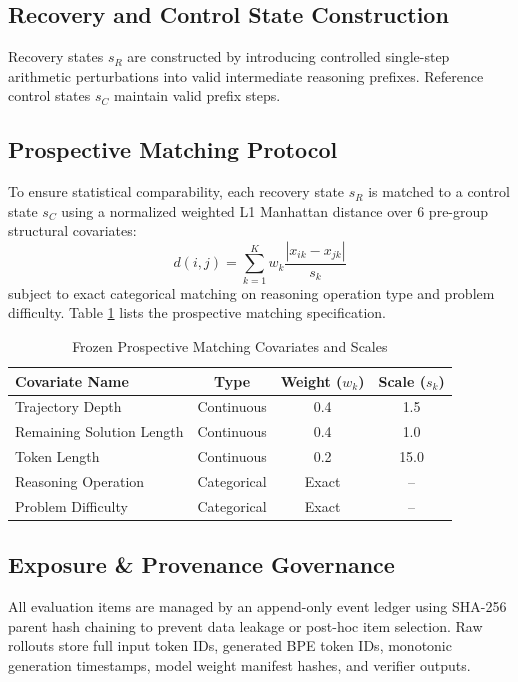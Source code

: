 \documentclass[10pt,conference]{IEEEtran}
\begin{document}
\subsection{Recovery and Control State Construction}
Recovery states $s_R$ are constructed by introducing controlled single-step arithmetic perturbations into valid intermediate reasoning prefixes. Reference control states $s_C$ maintain valid prefix steps.

\subsection{Prospective Matching Protocol}
To ensure statistical comparability, each recovery state $s_R$ is matched to a control state $s_C$ using a normalized weighted L1 Manhattan distance over 6 pre-group structural covariates:
\begin{equation}
d(i, j) = \sum_{k=1}^K w_k \frac{|x_{ik} - x_{jk}|}{s_k}
\end{equation}
subject to exact categorical matching on reasoning operation type and problem difficulty. Table \ref{tab:covariates} lists the prospective matching specification.

\begin{table}[htbp]
\caption{Frozen Prospective Matching Covariates and Scales}
\label{tab:covariates}
\centering
\begin{tabular}{lccc}
\toprule
\textbf{Covariate Name} & \textbf{Type} & \textbf{Weight ($w_k$)} & \textbf{Scale ($s_k$)} \\
\midrule
Trajectory Depth & Continuous & 0.4 & 1.5 \\
Remaining Solution Length & Continuous & 0.4 & 1.0 \\
Token Length & Continuous & 0.2 & 15.0 \\
Reasoning Operation & Categorical & Exact & -- \\
Problem Difficulty & Categorical & Exact & -- \\
\bottomrule
\end{tabular}
\end{table}

\subsection{Exposure \& Provenance Governance}
All evaluation items are managed by an append-only event ledger using SHA-256 parent hash chaining to prevent data leakage or post-hoc item selection. Raw rollouts store full input token IDs, generated BPE token IDs, monotonic generation timestamps, model weight manifest hashes, and verifier outputs.
\end{document}
